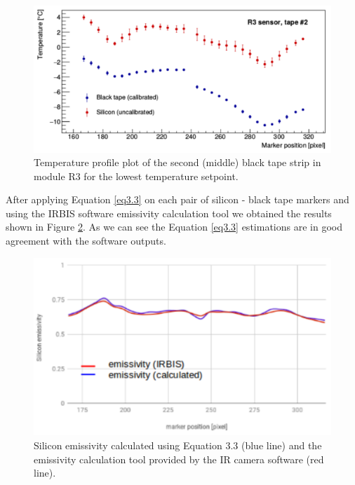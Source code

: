 		\begin{figure}[ht!]
			\centering
			\captionsetup{justification=centering,margin=2cm}
			\includegraphics[scale=0.35]{Figures/Chapter04/R3Profile_Si_and_BT.pdf}
			\caption{Temperature profile plot of the second (middle) black tape strip in module R3 for the lowest temperature setpoint.}\label{fig4.5}
		\end{figure}
		
		After applying Equation \ref{eq3.3} on each pair of silicon - black tape markers and using the IRBIS software emissivity calculation tool we obtained the results shown in Figure \ref{fig4.6}. As we can see the Equation \ref{eq3.3} estimations are in good agreement with the software outputs. 
	
		\begin{figure}[ht!]
			\centering
			\captionsetup{justification=centering,margin=2cm}
			\includegraphics[scale=0.35]{Figures/Chapter04/SiliconEmissivityCalculatedVSIRBIS.pdf}
			\caption{Silicon emissivity calculated using Equation 3.3 (blue line) and the emissivity calculation tool provided by the IR camera software (red line).}\label{fig4.6}
		\end{figure}
		
